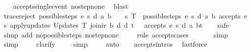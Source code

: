 \begin{isabellebody}
%
\isadelimproof
\ \ %
\endisadelimproof
%
\isatagproof
{}\isamarkupfalse%
\ accepts{\isacharunderscore}single{\isacharunderscore}event\ no{\isacharunderscore}step{\isacharunderscore}none\ \isamarkupfalse%
\ blast%
\endisatagproof
{\isafoldproof}%
%
\isadelimproof
\isanewline
%
\endisadelimproof
\isanewline
{}\isamarkupfalse%
\ trace{\isacharunderscore}reject{\isacharcolon}\ {\isachardoublequoteopen}{\isacharparenleft}possible{\isacharunderscore}steps\ e\ s\ d\ a\ b\ {\isacharequal}\ {\isacharbraceleft}{\isacharbar}{\isacharbar}{\isacharbraceright}\ {\isasymor}\ {\isacharparenleft}{\isasymforall}{\isacharparenleft}s{\isacharprime}{\isacharcomma}\ T{\isacharparenright}\ {\isacharbar}{\isasymin}{\isacharbar}\ possible{\isacharunderscore}steps\ e\ s\ d\ a\ b{\isachardot}\ {\isasymnot}accepts\ e\ s{\isacharprime}\ {\isacharparenleft}apply{\isacharunderscore}updates\ {\isacharparenleft}Updates\ T{\isacharparenright}\ {\isacharparenleft}join{\isacharunderscore}ir\ b\ d{\isacharparenright}\ d{\isacharparenright}\ t{\isacharparenright}{\isacharparenright}\ {\isacharequal}\ {\isacharparenleft}{\isasymnot}\ accepts\ e\ s\ d\ {\isacharparenleft}{\isacharparenleft}a{\isacharcomma}\ b{\isacharparenright}{\isacharhash}t{\isacharparenright}{\isacharparenright}{\isachardoublequoteclose}\isanewline
%
\isadelimproof
\ \ %
\endisadelimproof
%
\isatagproof
{}\isamarkupfalse%
\ safe\isanewline
\ \ \ \ \isamarkupfalse%
\ {\isacharparenleft}simp\ add{\isacharcolon}\ no{\isacharunderscore}possible{\isacharunderscore}steps{\isacharunderscore}{}\ no{\isacharunderscore}step{\isacharunderscore}none{\isacharparenright}\isanewline
\ \ \ \isamarkupfalse%
\ {\isacharparenleft}rule\ accepts{\isachardot}cases{\isacharparenright}\isanewline
\ \ \ \ \ \isamarkupfalse%
\ simp\isanewline
\ \ \ \ \isamarkupfalse%
\ simp\isanewline
\ \ \ \isamarkupfalse%
\ clarify\isanewline
\ \ \ \isamarkupfalse%
\ simp\isanewline
\ \ \ \isamarkupfalse%
\ auto{\isacharbrackleft}{}{\isacharbrackright}\isanewline
\ \ \isamarkupfalse%
\ accepts{\isachardot}intros{\isacharparenleft}{}{\isacharparenright}\ \isamarkupfalse%
\ fastforce%
\endisatagproof
{\isafoldproof}%
%
\isadelimproof
\isanewline
%
\endisadelimproof
\isanewline
{}\isamarkupfalse%

\end{isabellebody}
